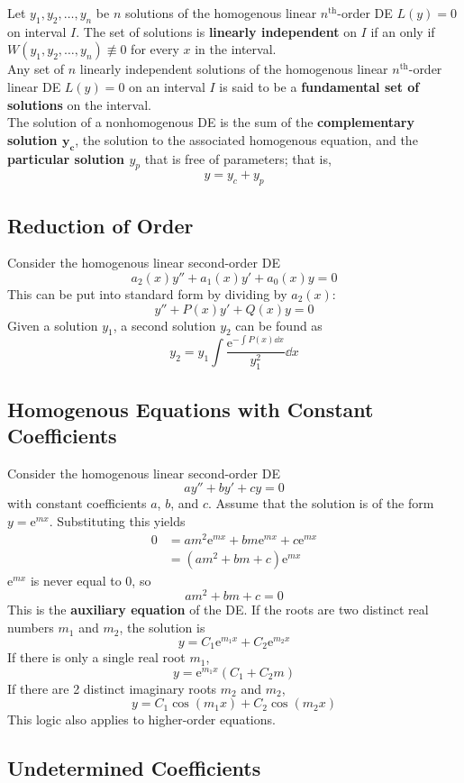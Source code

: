 \documentclass[12pt, A4]{article}
\newcommand{\en}{\text{e}}
\renewcommand{\th}{\text{th}}
\begin{document}
			Let \(y_1, y_2, \ldots, y_n\) be \(n\) solutions of the homogenous linear \(n^{\th}\)-order DE \(L(y) = 0\) on interval \(I\). The set of solutions is \textbf{linearly independent} on \(I\) if an only if \(W(y_1, y_2, \ldots, y_n) \not\equiv 0\) for every \(x\) in the interval. \\
			Any set of \(n\) linearly independent solutions of the homogenous linear \(n^{\th}\)-order linear DE \(L(y) = 0\) on an interval \(I\) is said to be a \textbf{fundamental set of solutions} on the interval. \\
			The solution of a nonhomogenous DE is the sum of the \textbf{complementary solution \(\bm{y_c}\)}, the solution to the associated homogenous equation, and the \textbf{particular solution \(y_p\)} that is free of parameters; that is,
				\[y = y_c + y_p\]
		\subsection{Reduction of Order}
			Consider the homogenous linear second-order DE
				\[a_2(x)y''+ a_1(x)y' + a_0(x)y = 0\]
				This can be put into standard form by dividing by \(a_2(x)\):
				\[y'' + P(x)y' + Q(x)y = 0\]
				Given a solution \(y_1\), a second solution \(y_2\) can be found as
				\[\boxed{y_2 = y_1\int \frac{\en^{-\int P(x) \dd{x}}}{y_1^2}\dd{x}}\]
		\subsection{Homogenous Equations with Constant Coefficients}
			Consider the homogenous linear second-order DE
				\[ay'' + by' + cy = 0\]
				with constant coefficients \(a\), \(b\), and \(c\). Assume that the solution is of the form \(y = \en^{mx}\). Substituting this yields
				\begin{align*}
					0 &= am^2\en^{mx} + bm\en^{mx} + c\en^{mx} \\
						&= (am^2 + bm + c)\en^{mx}
				\end{align*}
				\(\en^{mx}\) is never equal to 0, so
				\[\boxed{am^2 + bm + c = 0}\]
				This is the \textbf{auxiliary equation} of the DE. If the roots are two distinct real numbers \(m_1\) and \(m_2\), the solution is
				\[y = C_1\en^{m_1x} + C_2\en^{m_2x}\]
				If there is only a single real root \(m_1\),
				\[y = \en^{m_1x}(C_1 + C_2m)\]
				If there are 2 distinct imaginary roots \(m_2\) and \(m_2\),
				\[y = C_1\cos(m_1 x) + C_2\cos(m_2 x)\]
				This logic also applies to higher-order equations.
		\subsection{Undetermined Coefficients}
\end{document}
